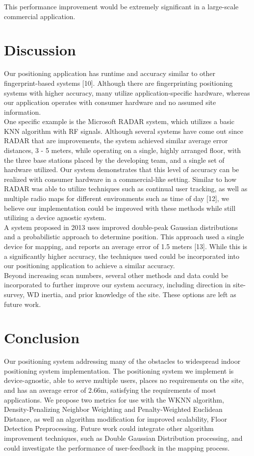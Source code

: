 \documentclass[conference]{IEEEtran}
\begin{document}
This performance improvement would be extremely significant in a large-scale commercial application.

\section{Discussion}
\indent Our positioning application has runtime and accuracy similar to other fingerprint-based systems [10]. Although there are fingerprinting positioning systems with higher accuracy, many utilize application-specific hardware, whereas our application operates with  consumer hardware and no assumed site information.\\
\indent One specific example is the Microsoft RADAR system, which utilizes a basic KNN algorithm with RF signals. Although several systems have come out since RADAR that are improvements, the system achieved similar average error distances, 3 - 5 meters, while operating on a single, highly arranged floor, with the three base stations placed by the developing team, and a single set of hardware utilized. Our system demonstrates that this level of accuracy can be realized with consumer hardware in a commercial-like setting. Similar to how RADAR was able to utilize techniques such as continual user tracking, as well as multiple radio maps for different environments such as time of day [12], we believe our implementation could be improved with these methods while still utilizing a device agnostic system.\\
\indent A system proposed in 2013 uses improved double-peak Gaussian distributions and a probabilistic approach to determine position. This approach used a single device for mapping, and reports an average error of 1.5 meters [13]. While this is a significantly higher accuracy, the techniques used could be incorporated into our positioning application to achieve a similar accuracy.\\ 
\indent Beyond increasing scan numbers, several other methods and data could be incorporated to further improve our system accuracy, including direction in site-survey, WD inertia, and prior knowledge of the site. These options are left as future work.



\section{Conclusion}
Our positioning system addressing many of the obstacles to widespread indoor positioning system implementation. The positioning system we implement is device-agnostic, able to serve multiple users, places no requirements on the site, and has an average error of 2.66m, satisfying the requirements of most applications. We propose two metrics for use with the WKNN algorithm, Density-Penalizing Neighbor Weighting and Penalty-Weighted Euclidean Distance, as well an algorithm modification for improved scalability, Floor Detection Preprocessing. Future work could integrate other algorithm improvement techniques, such as Double Gaussian Distribution processing, and could investigate the performance of user-feedback in the mapping process.
\end{document}
